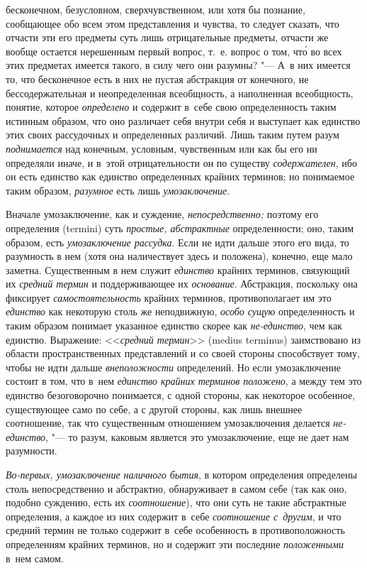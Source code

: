 бесконечном, безусловном, сверхчувственном, или хотя бы познание,
сообщающее обо всем этом представления и чувства, то следует сказать, что
отчасти эти его предметы суть лишь отрицательные предметы, отчасти же
вообще остается нерешенным первый вопрос, т.~е. вопрос о том, чт\'{о} во всех
этих предметах имеется такого, в силу чего они разумны? "--- А~в них имеется
то, что бесконечное есть в них не пустая абстракция от конечного, не
бессодержательная и неопределенная всеобщность, а наполненная всеобщность,
понятие, которое {\em определено} и содержит в~себе свою определенность таким
истинным образом, что оно различает себя внутри себя и выступает как единство
этих своих рассудочных и определенных различий. Лишь таким путем разум
{\em поднимается} над конечным, условным, чувственным или как бы его ни
определяли иначе, и в~этой отрицательности он по существу {\em содержателен},
ибо он есть единство как единство определенных крайних терминов; но понимаемое
таким образом, {\em разумное} есть лишь {\em умозаключение}.

Вначале умозаключение, как и суждение, {\em непосредственно;} поэтому его
определения (termini) суть {\em простые, абстрактные} определенности;
оно, таким образом, есть {\em умозаключение рассудка}. Если не идти дальше
этого его вида, то разумность в нем (хотя она наличествует здесь и положена),
конечно, еще мало заметна. Существенным в нем служит {\em единство} крайних
терминов, связующий их {\em средний термин} и поддерживающее их
{\em основание}. Абстракция, поскольку она фиксирует {\em самостоятельность}
крайних терминов, противополагает им это {\em единство} как некоторую столь же
неподвижную, {\em особо сущую} определенность и таким образом понимает
указанное единство скорее как {\em не-единство}, чем как единство. Выражение:
<<{\em средний термин}>> (medius terminus) заимствовано из области
пространственных представлений и со своей стороны способствует тому, чтобы не
идти дальше {\em внеположности} определений. Но если умозаключение состоит в
том, что в~нем {\em единство крайних терминов положено}, а между тем это
единство безоговорочно понимается, с одной стороны, как некоторое особенное,
существующее само по себе, а с другой стороны, как лишь внешнее соотношение,
так что существенным отношением умозаключения делается {\em не-единство}, "---
то разум, каковым является это умозаключение, еще не дает нам разумности.

{\em Во-первых, умозаключение наличного бытия},
в котором определения определены столь непосредственно и
абстрактно, обнаруживает в самом себе (так как оно, подобно суждению, есть
их {\em соотношение}), что они суть не такие абстрактные определения, а каждое
из них содержит в~себе {\em соотношение с~другим}, и что средний термин не
только содержит в~себе особенность в противоположность определениям крайних
терминов, но и содержит эти последние {\em положенными} в~нем самом.

